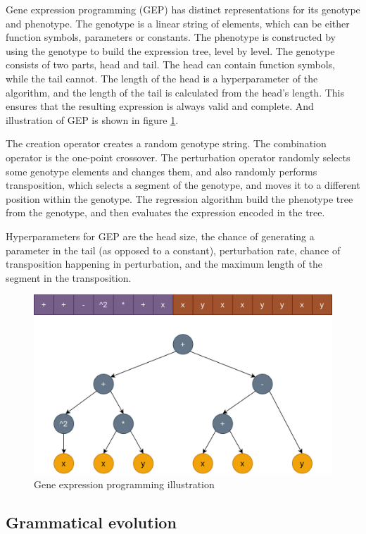 Gene expression programming (GEP) \citep{gep} has distinct representations for its genotype and phenotype. The genotype is a linear string of elements, which can be either function symbols, parameters or constants. The phenotype is constructed by using the genotype to build the expression tree, level by level. The genotype consists of two parts, head and tail. The head can contain function symbols, while the tail cannot. The length of the head is a hyperparameter of the algorithm, and the length of the tail is calculated from the head's length. This ensures that the resulting expression is always valid and complete. And illustration of GEP is shown in figure \ref{fig:gep}.

The creation operator creates a random genotype string. The combination operator is the one-point crossover. The perturbation operator randomly selects some genotype elements and changes them, and also randomly performs transposition, which selects a segment of the genotype, and moves it to a different position within the genotype. The regression algorithm build the phenotype tree from the genotype, and then evaluates the expression encoded in the tree.

Hyperparameters for GEP are the head size, the chance of generating a parameter in the tail (as opposed to a constant), perturbation rate, chance of transposition happening in perturbation, and the maximum length of the segment in the transposition.

\begin{figure}[!htbp]
	\centering
	\includegraphics[scale=0.3]{../images/gep.png}
	\caption{Gene expression programming illustration}
    \label{fig:gep}
\end{figure}

\subsection{Grammatical evolution}

